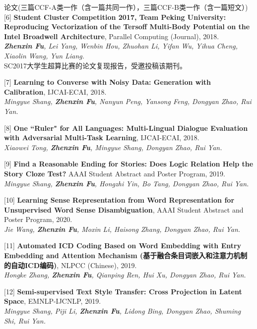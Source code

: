 \documentclass{resume} %
\begin{document}
\begin{rSection}{论文(三篇CCF-A类一作（含一篇共同一作），三篇CCF-B类一作（含一篇短文）)}
    [6] \textbf{Student Cluster Competition 2017, Team Peking University: Reproducing Vectorization of the Tersoff Multi-Body Potential on the Intel Broadwell Architecture}, Parallel Computing (Journal), 2018. \\
    {\it \textbf{Zhenxin Fu}, Lei Yang, Wenbin Hou, Zhuohan Li, Yifan Wu, Yihua Cheng, Xiaolin Wang, Yun Liang.} \\
    SC2017大学生超算比赛的论文复现报告，受邀投稿该期刊。
    \vspace{-0.1cm}

    [7] \textbf{Learning to Converse with Noisy Data: Generation with Calibration}, IJCAI-ECAI, 2018. \\
    {\it Mingyue Shang, \textbf{Zhenxin Fu}, Nanyun Peng, Yansong Feng, Dongyan Zhao, Rui Yan.} 
    \vspace{-0.1cm}

    [8] \textbf{One ``Ruler" for All Languages: Multi-Lingual Dialogue Evaluation with Adversarial Multi-Task Learning}, IJCAI-ECAI, 2018. \\
    {\it Xiaowei Tong, \textbf{Zhenxin Fu}, Mingyue Shang, Dongyan Zhao, Rui Yan.}
    \vspace{-0.1cm}

    [9] \textbf{Find a Reasonable Ending for Stories: Does Logic Relation Help the Story Cloze Test?} AAAI Student Abstract and Poster Program, 2019. \\
    {\it Mingyue Shang, \textbf{Zhenxin Fu}, Hongzhi Yin, Bo Tang, Dongyan Zhao, Rui Yan.}
    \vspace{-0.1cm}

    [10] \textbf{Learning Sense Representation from Word Representation for Unsupervised Word Sense Disambiguation}, AAAI Student Abstract and Poster Program, 2020. \\
    {\it Jie Wang, \textbf{Zhenxin Fu}, Moxin Li, Haisong Zhang, Dongyan Zhao, Rui Yan.}
    \vspace{-0.1cm}

    [11] \textbf{Automated ICD Coding Based on Word Embedding with Entry Embedding and Attention Mechanism (基于融合条目词嵌入和注意力机制的自动ICD编码)}, NLPCC (Chinese), 2019. \\
    {\it Hongke Zhang, \textbf{Zhenxin Fu}, Qianping Ren, Hui Xu, Dongyan Zhao, Rui Yan.}
    \vspace{-0.1cm}

    [12] \textbf{Semi-supervised Text Style Transfer: Cross Projection in Latent Space}, EMNLP-IJCNLP, 2019. \\
    {\it Mingyue Shang, Piji Li, \textbf{Zhenxin Fu}, Lidong Bing, Dongyan Zhao, Shuming Shi, Rui Yan.}
    \vspace{-0.1cm}


\end{rSection}
\end{document}
